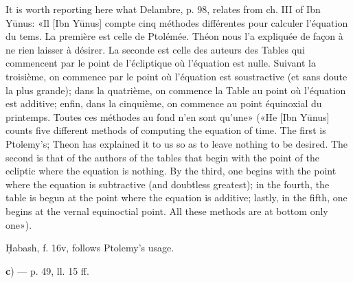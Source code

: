 \documentclass[11pt]{article}
\begin{document}
\par It is worth reporting here what Delambre, p. 98, relates from ch. III of Ibn Yūnus: «Il [Ibn Yūnus] compte cinq méthodes différentes pour calculer l’équation du tems. La première est celle de Ptolémée. Théon nous l’a expliquée de façon à ne rien laisser à désirer. La seconde est celle des auteurs des Tables qui commencent par le point de l’écliptique où l’équation est nulle. Suivant la troisième, on commence par le point où l’équation est soustractive (et sans doute la plus grande); dans la quatrième, on commence la Table au point où l’équation est additive; enfin, dans la cinquième, on commence au point équinoxial du printemps. Toutes ces méthodes au fond n’en sont qu’une» («He [Ibn Yūnus] counts five different methods of computing the equation of time. The first is Ptolemy's; Theon has explained it to us so as to leave nothing to be desired. The second is that of the authors of the tables that begin with the point of the ecliptic where the equation is nothing. By the third, one begins with the point where the equation is subtractive (and doubtless greatest); in the fourth, the table is begun at the point where the equation is additive; lastly, in the fifth, one begins at the vernal equinoctial point. All these methods are at bottom only one»).\par
\par Ḥabash, f. 16v, follows Ptolemy's usage.\par
\par\begin{center}\textbf{c}) — p. 49, ll. 15 ff.\end{center}
\par [«\emph{The given mean place of the sun}» here means the initial mean place; «\emph{the other mean place}», the mean place that the sun has reached at that time. Plainly, as in the \emph{Almagest}, the problem is to correct a given interval of true time so as to know the interval of mean time corresponding to it. — Schiaparelli.]\par
\end{document}
